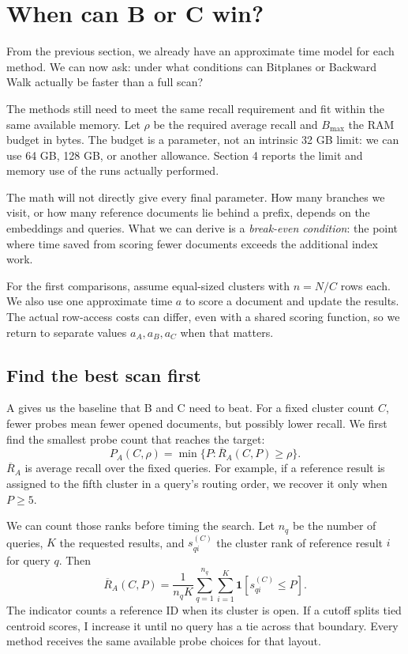 \section{When can B or C win?}
From the previous section, we already have an approximate time model for each method. We can now ask: under what conditions can Bitplanes or Backward Walk actually be faster than a full scan?

The methods still need to meet the same recall requirement and fit within the same available memory. Let $\rho$ be the required average recall and $B_{\max}$ the RAM budget in bytes. The budget is a parameter, not an intrinsic 32 GB limit: we can use 64 GB, 128 GB, or another allowance. Section 4 reports the limit and memory use of the runs actually performed.

The math will not directly give every final parameter. How many branches we visit, or how many reference documents lie behind a prefix, depends on the embeddings and queries. What we can derive is a \emph{break-even condition}: the point where time saved from scoring fewer documents exceeds the additional index work.

For the first comparisons, assume equal-sized clusters with $n=N/C$ rows each. We also use one approximate time $a$ to score a document and update the results. The actual row-access costs can differ, even with a shared scoring function, so we return to separate values $a_A,a_B,a_C$ when that matters.

\subsection{Find the best scan first}
A gives us the baseline that B and C need to beat. For a fixed cluster count $C$, fewer probes mean fewer opened documents, but possibly lower recall. We first find the smallest probe count that reaches the target:
\[
 \boxed{P_A(C,\rho)=\min\{P:\overline R_A(C,P)\ge\rho\}.}
\]
$\overline R_A$ is average recall over the fixed queries. For example, if a reference result is assigned to the fifth cluster in a query's routing order, we recover it only when $P\ge5$.

We can count those ranks before timing the search. Let $n_q$ be the number of queries, $K$ the requested results, and $s_{qi}^{(C)}$ the cluster rank of reference result $i$ for query $q$. Then
\[
 \overline R_A(C,P)=\frac{1}{n_qK}
 \sum_{q=1}^{n_q}\sum_{i=1}^{K}\mathbf 1[s_{qi}^{(C)}\le P].
\]
The indicator counts a reference ID when its cluster is open. If a cutoff splits tied centroid scores, I increase it until no query has a tie across that boundary. Every method receives the same available probe choices for that layout.

